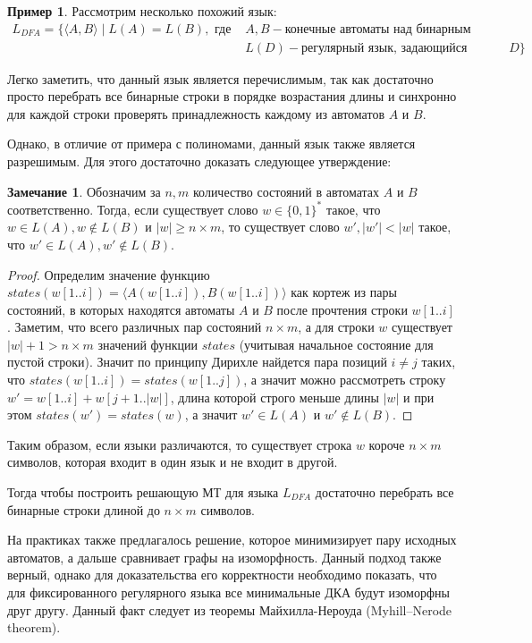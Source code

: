 \documentclass[
    11pt,
    a4paper
]{article}
\theoremstyle{definition}
\newtheorem{note}[theorem]{Замечание}
\newtheorem{example}[theorem]{Пример}
\begin{document}
\begin{example}
Рассмотрим несколько похожий язык: 
\begin{align*}
L_{DFA} = \{ \langle A, B \rangle \mid L(A) = L(B), \textit{ где } &A, B - \textit{конечные автоматы над бинарным алфавитом, а } \\
&L(D) - \textit{регулярный язык, задающийся автоматом } D 
\}
\end{align*}

Легко заметить, что данный язык является перечислимым, так как достаточно просто перебрать все бинарные строки в порядке возрастания длины и синхронно для каждой строки проверять принадлежность каждому из автоматов $A$ и $B$. 

Однако, в отличие от примера с полиномами, данный язык также является разрешимым. Для этого достаточно доказать следующее утверждение:
\begin{note}
Обозначим за $n, m$ количество состояний в автоматах $A$ и $B$ соответственно. Тогда, если существует слово $w \in \{0, 1\}^*$ такое, что $w \in L(A), w \notin L(B)$ и $|w| \geq n \times m$, то существует слово $w', |w'| < |w|$ такое, что $w' \in L(A), w' \notin L(B)$.
\end{note}
\begin{proof}
Определим значение функцию $states(w[1..i]) = \langle A(w[1..i]), B(w[1..i]) \rangle$ как кортеж из пары состояний, в которых находятся автоматы $A$ и $B$ после прочтения строки $w[1..i]$. Заметим, что всего различных пар состояний $n \times m$, а для строки $w$ существует $|w| + 1 > n \times m$ значений функции $states$ (учитывая начальное состояние для пустой строки). Значит по принципу Дирихле найдется пара позиций $i \ne j$ таких, что $states(w[1..i]) = states(w[1..j])$, а значит можно рассмотреть строку $w' = w[1..i] + w[j + 1..|w|]$, длина которой строго меньше длины $|w|$ и при этом $states(w') = states(w)$, а значит $w' \in L(A)$ и $w' \notin L(B)$.
\end{proof}
Таким образом, если языки различаются, то существует строка $w$ короче $n \times m$ символов, которая входит в один язык и не входит в другой.

Тогда чтобы построить решающую МТ для языка $L_{DFA}$ достаточно перебрать все бинарные строки длиной до $n \times m$ символов.
\end{example}

На практиках также предлагалось решение, которое минимизирует пару исходных автоматов, а дальше сравнивает графы на изоморфность. Данный подход также верный, однако для доказательства его корректности необходимо показать, что для фиксированного регулярного языка все минимальные ДКА будут изоморфны друг другу. Данный факт следует из теоремы Майхилла-Нероуда (Myhill–Nerode theorem).
\end{document}
